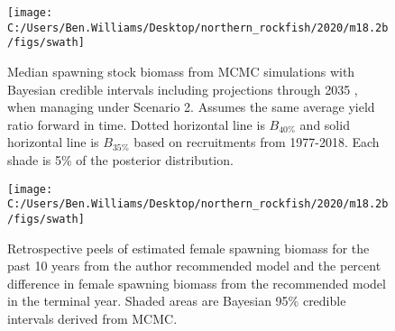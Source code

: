 \documentclass[
  11pt,
]{article}
\begin{document}
\begin{figure}
\texttt{[image: C:/Users/Ben.Williams/Desktop/northern\_rockfish/2020/m18.2b/figs/swath]} \caption{Median spawning stock biomass from MCMC simulations with Bayesian credible intervals including projections through 2035 , when managing under Scenario 2. Assumes the same average yield ratio forward in time. Dotted horizontal line is $B_{40\%}$ and solid horizontal line is $B_{35\%}$ based on recruitments from 1977-2018. Each shade is 5\% of the posterior distribution.}\label{fig:fig15}
\end{figure}

\begin{figure}
\texttt{[image: C:/Users/Ben.Williams/Desktop/northern\_rockfish/2020/m18.2b/figs/swath]} \caption{Retrospective peels of estimated female spawning biomass for the past 10 years from the author recommended model and the percent difference in female spawning biomass from the recommended model in the terminal year. Shaded areas are Bayesian 95\% credible intervals derived from MCMC.}\label{fig:fig16}
\end{figure}

\pagebreak
\end{document}
